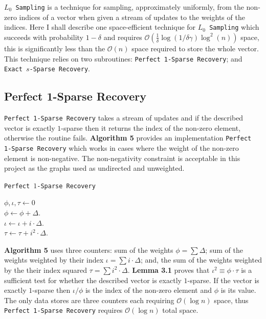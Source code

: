 \documentclass[11pt,twoside,a4paper]{report}
\begin{document}
\par\texttt{$L_0$ Sampling} \cite{L0Framework,LpSurvey} is a technique for sampling, approximately uniformly, from the non-zero indices of a vector when given a stream of updates to the weights of the indices. Here I shall describe one space-efficient technique for \texttt{$L_0$ Sampling} which succeeds with probability $1-\delta$ and requires $\mathcal{O}\left(\frac1\delta\log(1/\delta\gamma)\log^2(n)\right)$ space, this is significantly less than the $\mathcal{O}(n)$ space required to store the whole vector. This technique relies on two subroutines: \texttt{Perfect 1-Sparse Recovery}; and \texttt{Exact $s$-Sparse Recovery}.

\subsection{Perfect 1-Sparse Recovery}

\par \texttt{Perfect 1-Sparse Recovery} takes a stream of updates and if the described vector is exactly $1$-sparse then it returns the index of the non-zero element, otherwise the routine fails. \textbf{Algorithm 5} provides an implementation \texttt{Perfect 1-Sparse Recovery} which works in cases where the weight of the non-zero element is non-negative. The non-negativity constraint is acceptable in this project as the graphs used as undirected and unweighted.

\begin{algorithm}
	\caption{\texttt{Perfect $1$-Sparse Recovery}}
	$\phi,\iota,\tau\leftarrow0$\\
	 {
		$\phi\leftarrow\phi+\Delta$.\\
		$\iota\leftarrow\iota+i\cdot\Delta$.\\
		$\tau\leftarrow\tau+i^2\cdot\Delta$.\\
	}
\end{algorithm}

\textbf{Algorithm 5} uses three counters: sum of the weights $\phi=\sum\Delta$; sum of the weights weighted by their index $\iota=\sum i\cdot\Delta$; and, the sum of the weights weighted by the their index squared $\tau=\sum i^2\cdot\Delta$. \textbf{Lemma 3.1} proves that $\iota^2\equiv\phi\cdot\tau$ is a sufficient test for whether the described vector is exactly $1$-sparse. If the vector is exactly $1$-sparse then $\iota/\phi$ is the index of the non-zero element and $\phi$ is its value. The only data stores are three counters each requiring $\mathcal{O}(\log n)$ space, thus \texttt{Perfect 1-Sparse Recovery} requires $\mathcal{O}(\log n)$ total space.
\end{document}
